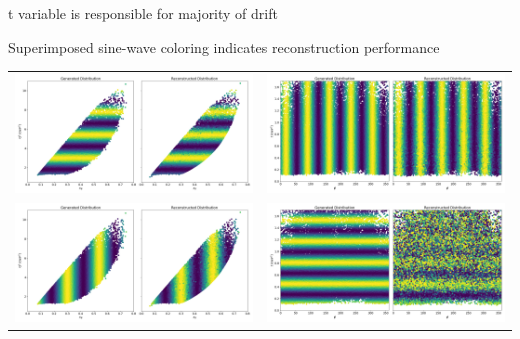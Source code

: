 \documentclass[aspectratio=169]{beamer}
\begin{document}
\begin{frame}{t variable is responsible for majority of drift}

\centering
Superimposed sine-wave coloring indicates reconstruction performance
     \begin{center}
            \begin{tabular}{cc}
                \includegraphics[width=0.345\linewidth]{Main/ibu/waving/sine_plots_Q2.png} & 
                \includegraphics[width=0.345\linewidth]{Main/ibu/waving/sine_plots_phi.png} \\
                \includegraphics[width=0.345\linewidth]{Main/ibu/waving/sine_plots_xB.png} & 
                \includegraphics[width=0.345\linewidth]{Main/ibu/waving/sine_plots_t.png} \\
            \end{tabular}
        \end{center}
\end{frame}
\end{document}
